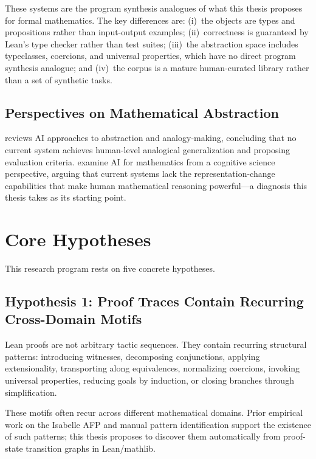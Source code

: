 \documentclass[12pt, a4paper]{article}
\begin{document}
These systems are the program synthesis analogues of what this thesis
proposes for formal mathematics. The key differences are: (i)~the objects
are types and propositions rather than input-output examples; (ii)~correctness
is guaranteed by Lean's type checker rather than test suites; (iii)~the
abstraction space includes typeclasses, coercions, and universal properties,
which have no direct program synthesis analogue; and (iv)~the corpus is a
mature human-curated library rather than a set of synthetic tasks.

\subsection{Perspectives on Mathematical Abstraction}

\citet{mitchell2021} reviews AI approaches to abstraction and
analogy-making, concluding that no current system achieves human-level
analogical generalization and proposing evaluation criteria.
\citet{zhang2023cognitive} examine AI for mathematics from a cognitive
science perspective, arguing that current systems lack the
representation-change capabilities that make human mathematical reasoning
powerful---a diagnosis this thesis takes as its starting point.

\section{Core Hypotheses}

This research program rests on five concrete hypotheses.

\subsection{Hypothesis 1: Proof Traces Contain Recurring Cross-Domain Motifs}

Lean proofs are not arbitrary tactic sequences. They contain recurring
structural patterns: introducing witnesses, decomposing conjunctions,
applying extensionality, transporting along equivalences, normalizing
coercions, invoking universal properties, reducing goals by induction, or
closing branches through simplification.

These motifs often recur across different mathematical domains. Prior
empirical work on the Isabelle AFP \citep{blanchette2015mining} and manual
pattern identification \citep{freitas2014} support the existence of such
patterns; this thesis proposes to discover them automatically from
proof-state transition graphs in Lean/mathlib.
\end{document}
